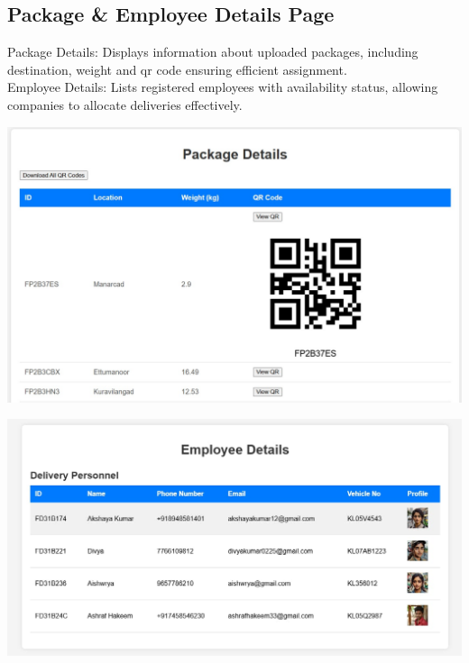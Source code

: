 \subsection{Package \& Employee Details Page}
Package Details: Displays information about uploaded packages, including destination, weight and qr code ensuring efficient assignment.
\\
Employee Details: Lists registered employees with availability status, allowing companies to allocate deliveries effectively.
\begin{center}
    \begin{minipage}{0.45\textwidth}
        \centering
        \includegraphics[width=\linewidth]{6/package_details.jpg}
    \end{minipage}
    \hfill
    \begin{minipage}{0.45\textwidth}
        \centering
        \includegraphics[width=\linewidth]{6/employee_details.jpg}
    \end{minipage}
\end{center}

